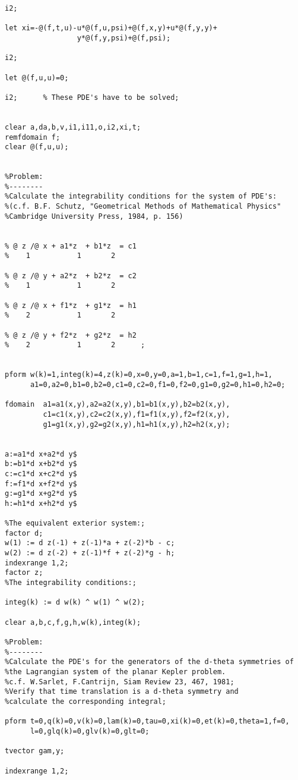 {\begin{verbatim}
i2;

let xi=-@(f,t,u)-u*@(f,u,psi)+@(f,x,y)+u*@(f,y,y)+
                 y*@(f,y,psi)+@(f,psi);

i2;

let @(f,u,u)=0;

i2;      % These PDE's have to be solved;


clear a,da,b,v,i1,i11,o,i2,xi,t;
remfdomain f;
clear @(f,u,u);


%Problem:
%--------
%Calculate the integrability conditions for the system of PDE's:
%(c.f. B.F. Schutz, "Geometrical Methods of Mathematical Physics"
%Cambridge University Press, 1984, p. 156)


% @ z /@ x + a1*z  + b1*z  = c1
%    1           1       2

% @ z /@ y + a2*z  + b2*z  = c2
%    1           1       2

% @ z /@ x + f1*z  + g1*z  = h1
%    2           1       2

% @ z /@ y + f2*z  + g2*z  = h2
%    2           1       2      ;


pform w(k)=1,integ(k)=4,z(k)=0,x=0,y=0,a=1,b=1,c=1,f=1,g=1,h=1,
      a1=0,a2=0,b1=0,b2=0,c1=0,c2=0,f1=0,f2=0,g1=0,g2=0,h1=0,h2=0;

fdomain  a1=a1(x,y),a2=a2(x,y),b1=b1(x,y),b2=b2(x,y),
         c1=c1(x,y),c2=c2(x,y),f1=f1(x,y),f2=f2(x,y),
         g1=g1(x,y),g2=g2(x,y),h1=h1(x,y),h2=h2(x,y);


a:=a1*d x+a2*d y$
b:=b1*d x+b2*d y$
c:=c1*d x+c2*d y$
f:=f1*d x+f2*d y$
g:=g1*d x+g2*d y$
h:=h1*d x+h2*d y$

%The equivalent exterior system:;
factor d;
w(1) := d z(-1) + z(-1)*a + z(-2)*b - c;
w(2) := d z(-2) + z(-1)*f + z(-2)*g - h;
indexrange 1,2;
factor z;
%The integrability conditions:;

integ(k) := d w(k) ^ w(1) ^ w(2);

clear a,b,c,f,g,h,w(k),integ(k);

%Problem:
%--------
%Calculate the PDE's for the generators of the d-theta symmetries of
%the Lagrangian system of the planar Kepler problem.
%c.f. W.Sarlet, F.Cantrijn, Siam Review 23, 467, 1981;
%Verify that time translation is a d-theta symmetry and 
%calculate the corresponding integral;

pform t=0,q(k)=0,v(k)=0,lam(k)=0,tau=0,xi(k)=0,et(k)=0,theta=1,f=0,
      l=0,glq(k)=0,glv(k)=0,glt=0;

tvector gam,y;

indexrange 1,2;


\end{verbatim}}
